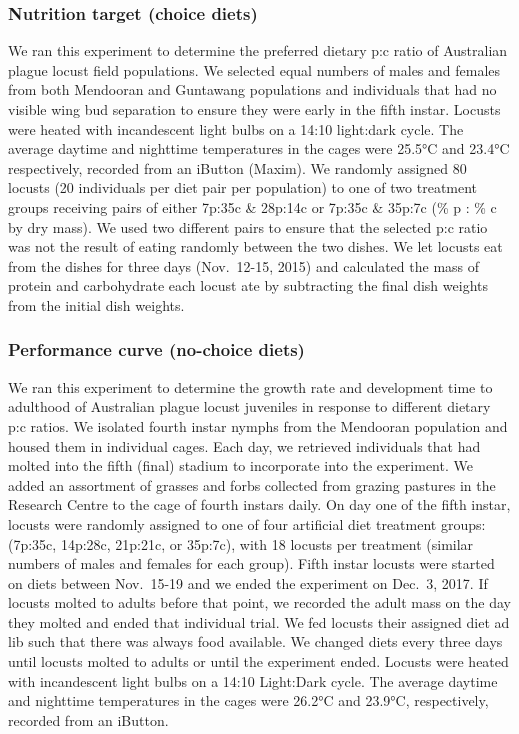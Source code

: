 \documentclass[
]{article}
\begin{document}
\subsubsection{Nutrition target (choice
diets)}\label{nutrition-target-choice-diets}

We ran this experiment to determine the preferred dietary p:c ratio of
Australian plague locust field populations. We selected equal numbers of
males and females from both Mendooran and Guntawang populations and
individuals that had no visible wing bud separation to ensure they were
early in the fifth instar. Locusts were heated with incandescent light
bulbs on a 14:10 light:dark cycle. The average daytime and nighttime
temperatures in the cages were 25.5°C and 23.4°C respectively, recorded
from an iButton (Maxim). We randomly assigned 80 locusts (20 individuals
per diet pair per population) to one of two treatment groups receiving
pairs of either 7p:35c \& 28p:14c or 7p:35c \& 35p:7c (\% p : \% c by
dry mass). We used two different pairs to ensure that the selected p:c
ratio was not the result of eating randomly between the two dishes. We
let locusts eat from the dishes for three days (Nov.~12-15, 2015) and
calculated the mass of protein and carbohydrate each locust ate by
subtracting the final dish weights from the initial dish weights.

\subsubsection{Performance curve (no-choice
diets)}\label{performance-curve-no-choice-diets}

We ran this experiment to determine the growth rate and development time
to adulthood of Australian plague locust juveniles in response to
different dietary p:c ratios. We isolated fourth instar nymphs from the
Mendooran population and housed them in individual cages. Each day, we
retrieved individuals that had molted into the fifth (final) stadium to
incorporate into the experiment. We added an assortment of grasses and
forbs collected from grazing pastures in the Research Centre to the cage
of fourth instars daily. On day one of the fifth instar, locusts were
randomly assigned to one of four artificial diet treatment groups:
(7p:35c, 14p:28c, 21p:21c, or 35p:7c), with 18 locusts per treatment
(similar numbers of males and females for each group). Fifth instar
locusts were started on diets between Nov.~15-19 and we ended the
experiment on Dec.~3, 2017. If locusts molted to adults before that
point, we recorded the adult mass on the day they molted and ended that
individual trial. We fed locusts their assigned diet ad lib such that
there was always food available. We changed diets every three days until
locusts molted to adults or until the experiment ended. Locusts were
heated with incandescent light bulbs on a 14:10 Light:Dark cycle. The
average daytime and nighttime temperatures in the cages were 26.2°C and
23.9°C, respectively, recorded from an iButton.
\end{document}
